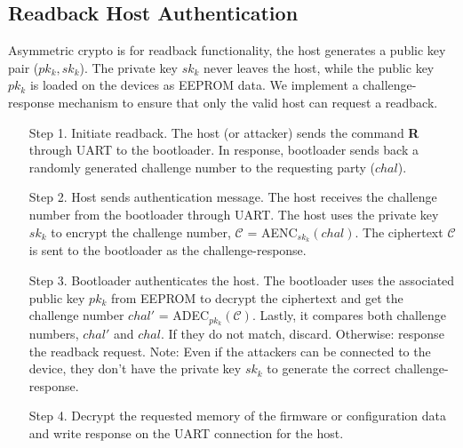 \documentclass[11pt,oneside,onecolumn,letterpaper]{article}
\begin{document}
\subsection{Readback Host Authentication}
Asymmetric crypto is for readback functionality, the host generates a public key pair ($pk_k, sk_k$).
The private key $sk_k$ never leaves the host, while the public key $pk_k$ is loaded on the devices as EEPROM data.
We implement a challenge-response mechanism to ensure that only the valid host can request a readback.
\begin{itemize}
  \item[Step 1.] Initiate readback. 
  The host (or attacker) sends the command \textbf{R} through UART to the bootloader.
  In response, bootloader sends back a randomly generated challenge number to the requesting party ($chal$).  
  \item[Step 2.] Host sends authentication message.
  The host receives the challenge number from the bootloader through UART.
  The host uses the private key $sk_k$ to encrypt the challenge number, $\mathcal{C}$ = AENC$_{sk_k}(chal)$.
  The ciphertext $\mathcal{C}$ is sent to the bootloader as the challenge-response.
  \item[Step 3.] Bootloader authenticates the host.
  The bootloader uses the associated public key $pk_k$ from EEPROM to decrypt the ciphertext and get the challenge number $chal'$ = ADEC$_{pk_k}(\mathcal{C})$.
  Lastly, it compares both challenge numbers, $chal'$ and $chal$.
  If they do not match, discard.
  Otherwise: response the readback request.
  Note: Even if the attackers can be connected to the device, they don't have the private key $sk_k$ to generate the correct challenge-response.
  \item [Step 4.] Decrypt the requested memory of the firmware or configuration data and write response on the UART connection for the host.
\end{itemize}








\end{document}
